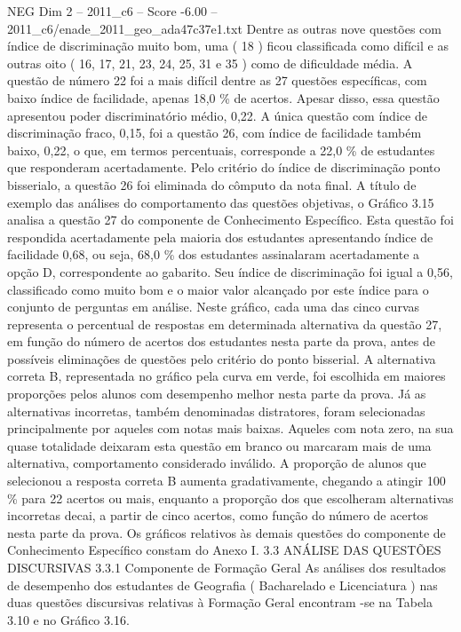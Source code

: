 \begin{textsample}{NEG Dim 2 – 2011\_c6 – Score -6.00 – 2011\_c6/enade\_2011\_geo\_ada47c37e1.txt}
Dentre as outras nove questões com índice de discriminação muito bom, uma ( 18 ) ficou classificada como difícil e as outras oito ( 16, 17, 21, 23, 24, 25, 31 e 35 ) como de dificuldade média.
A questão de número 22 foi a mais difícil dentre as 27 questões específicas, com baixo índice de facilidade, apenas 18,0 \% de acertos.
Apesar disso, essa questão apresentou poder discriminatório médio, 0,22.
A única questão com índice de discriminação fraco, 0,15, foi a questão 26, com índice de facilidade também baixo, 0,22, o que, em termos percentuais, corresponde a 22,0 \% de estudantes que responderam acertadamente.
Pelo critério do índice de discriminação ponto bisserialo, a questão 26 foi eliminada do cômputo da nota final.
A título de exemplo das análises do comportamento das questões objetivas, o Gráfico 3.15 analisa a questão 27 do componente de Conhecimento Específico.
Esta questão foi respondida acertadamente pela maioria dos estudantes apresentando índice de facilidade 0,68, ou seja, 68,0 \% dos estudantes assinalaram acertadamente a opção D, correspondente ao gabarito.
Seu índice de discriminação foi igual a 0,56, classificado como muito bom e o maior valor alcançado por este índice para o conjunto de perguntas em análise.
Neste gráfico, cada uma das cinco curvas representa o percentual de respostas em determinada alternativa da questão 27, em função do número de acertos dos estudantes nesta parte da prova, antes de possíveis eliminações de questões pelo critério do ponto bisserial.
A alternativa correta B, representada no gráfico pela curva em verde, foi escolhida em maiores proporções pelos alunos com desempenho melhor nesta parte da prova.
Já as alternativas incorretas, também denominadas distratores, foram selecionadas principalmente por aqueles com notas mais baixas.
Aqueles com nota zero, na sua quase totalidade deixaram esta questão em branco ou marcaram mais de uma alternativa, comportamento considerado inválido.
A proporção de alunos que selecionou a resposta correta B aumenta gradativamente, chegando a atingir 100 \% para 22 acertos ou mais, enquanto a proporção dos que escolheram alternativas incorretas decai, a partir de cinco acertos, como função do número de acertos nesta parte da prova.
Os gráficos relativos às demais questões do componente de Conhecimento Específico constam do Anexo I. 3.3 ANÁLISE DAS QUESTÕES DISCURSIVAS 3.3.1 Componente de Formação Geral As análises dos resultados de desempenho dos estudantes de Geografia ( Bacharelado e Licenciatura ) nas duas questões discursivas relativas à Formação Geral encontram -se na Tabela 3.10 e no Gráfico 3.16.

\end{textsample}
